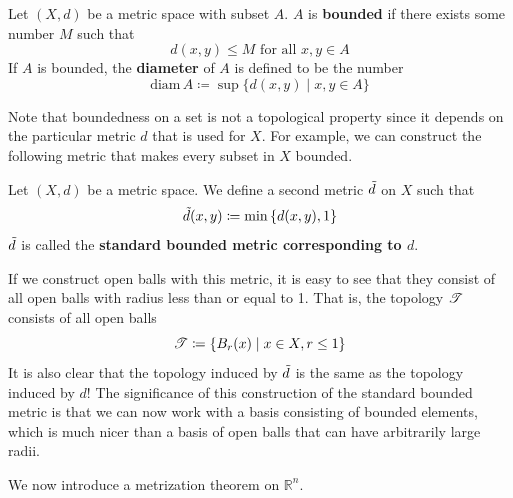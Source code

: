   \begin{definition}
    \label{def:bounded-set}
    Let $(X, d)$ be a metric space with subset $A$. $A$ is \textbf{bounded} if there exists some number $M$ such that
    \begin{equation}
      d (x, y) \leq M \text{ for all } x,y \in A
    \end{equation}
    If $A$ is bounded, the \textbf{diameter} of $A$ is defined to be the number
    \begin{equation}
      \text{diam}\, A \coloneqq \sup{\{d(x, y) \mid x, y \in A\}}
    \end{equation}
  \end{definition}

  Note that boundedness on a set is not a topological property since it depends on the particular metric $d$ that is used for $X$. For example, we can construct the following metric that makes every subset in $X$ bounded. 

  \begin{definition}
    \label{def:standard-bounded-metric}
    Let $(X, d)$ be a metric space. We define a second metric $\Tilde{d}$ on $X$ such that
    \begin{equation}
      \Tilde{d} (x, y) \coloneqq \min{\{d(x, y), 1\}}
    \end{equation}
    $\Tilde{d}$ is called the \textbf{standard bounded metric corresponding to $d$}. 
  \end{definition}

  If we construct open balls with this metric, it is easy to see that they consist of all open balls with radius less than or equal to 1. That is, the topology $\operatorname{\mathscr{T}}$ consists of all open balls
  \begin{equation}
    \operatorname{\mathscr{T}} \coloneqq \{B_r (x) \mid x \in X, r \leq 1\}
  \end{equation}
  It is also clear that the topology induced by $\Tilde{d}$ is the same as the topology induced by $d$! The significance of this construction of the standard bounded metric is that we can now work with a basis consisting of bounded elements, which is much nicer than a basis of open balls that can have arbitrarily large radii.  

  We now introduce a metrization theorem on $\mathbb{R}^n$. 

